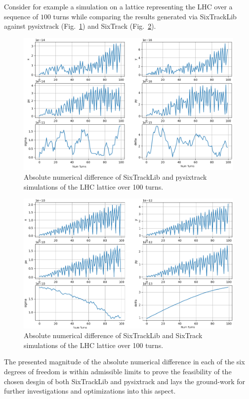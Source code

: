 \documentclass{ws-ijmpa}
\begin{document}
Consider for example a simulation on a lattice representing the LHC over a sequence of $100$ turns while comparing the results generated via SixTrackLib against pysixtrack (Fig.~\ref{fig:cmp_sixtracklib_pysixtrack}) and SixTrack (Fig.~\ref{fig:cmp_sixtracklib_sixtrack}). 
\begin{figure}[htb]
 \centering
 \includegraphics[width=\columnwidth]{cmp_sixtracklib_pysixtrack.png}
 \caption{Absolute numerical difference of SixTrackLib and pysixtrack simulations of the LHC lattice over 100 turns.}
 \label{fig:cmp_sixtracklib_pysixtrack}
\end{figure}
\begin{figure}[htb]
 \centering
 \includegraphics[width=\columnwidth]{cmp_sixtracklib_sixtrack.png}
 \caption{Absolute numerical difference of SixTrackLib and SixTrack simulations of the LHC lattice over 100 turns.}
 \label{fig:cmp_sixtracklib_sixtrack}
\end{figure}
The presented magnitude of the absolute numerical difference in each of the six degrees of freedom is within admissible limits to prove the feasibility of the chosen desgin of both SixTrackLib and pysixtrack and lays the ground-work for further investigations and optimizations into this aspect. 
\end{document}
